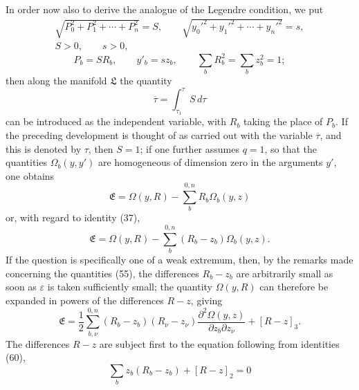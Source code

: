 \documentclass[11pt,a4paper,leqno]{article}
\begin{document}
In order now also to derive the analogue of the Legendre condition, we
put
\[
\begin{gathered}
\sqrt{P_0^2+P_1^2+\cdots+P_n^2}=S,\qquad
\sqrt{y_0'^2+y_1'^2+\cdots+y_n'^2}=s,\\
S>0,\qquad s>0,
\end{gathered}
\]
\begin{equation}\tag{60}
P_b=SR_b,\qquad y'_b=sz_b,\qquad
\sum_bR_b^2=\sum_bz_b^2=1;
\end{equation}
then along the manifold $\mathfrak{L}$ the quantity
\[
\overline{\tau}=\int_{\tau_1}^{\tau}S\,d\tau
\]
can be introduced as the independent variable, with $R_b$ taking the
place of $P_b$. If the preceding development is thought of as carried
out with the variable $\overline{\tau}$, and this is denoted by $\tau$,
then $S=1$; if one further assumes $q=1$, so that the quantities
$\Omega_b(y,y')$ are homogeneous of dimension zero in the arguments
$y'$, one obtains
\begin{equation}\tag{61}
\mathfrak{E}=\Omega(y,R)-\sum_b^{0,n}R_b\Omega_b(y,z)
\end{equation}
or, with regard to identity (37),
\[
\mathfrak{E}=\Omega(y,R)-\sum_b^{0,n}(R_b-z_b)\Omega_b(y,z).
\]
If the question is specifically one of a weak extremum, then, by the
remarks made concerning the quantities (55), the differences $R_b-z_b$
are arbitrarily small as soon as $\varepsilon$ is taken sufficiently
small; the quantity $\Omega(y,R)$ can therefore be expanded in powers
of the differences $R-z$, giving
\[
\mathfrak{E}=\frac12\sum_{b,\nu}^{0,n}(R_b-z_b)(R_\nu-z_\nu)
\frac{\partial^2\Omega(y,z)}{\partial z_b\partial z_\nu}+[R-z]_3.
\]
The differences $R-z$ are subject first to the equation following from
identities (60),
\begin{equation}\tag{62}
\sum_b z_b(R_b-z_b)+[R-z]_2=0
\end{equation}
\end{document}
